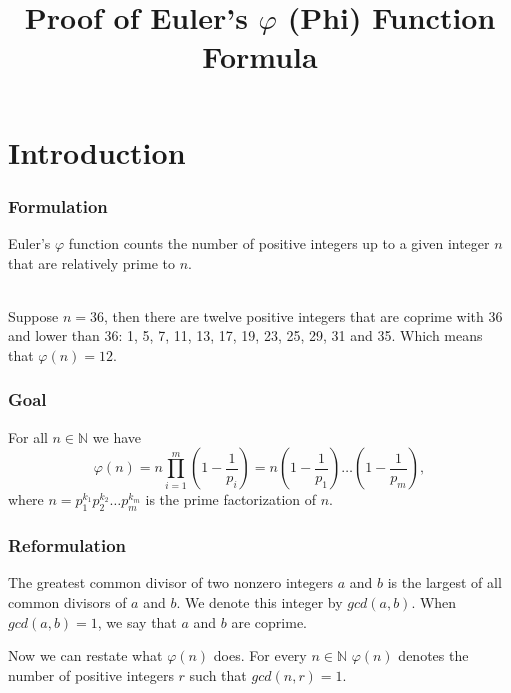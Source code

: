 \documentclass[envcountsect]{beamer}
\author[Emils Kalugins]{Presented by Emils Kalugins \\~\\
{\small Paper\footnotemark{} authored by:\\ Shashank Chorge\footnotemark{} \and Juan Vargas\footnotemark{}}}
\title{Proof of Euler's $\varphi$ (Phi) Function Formula}
\institute{Univesity of Latvia}
\begin{document}
\begin{frame}
\maketitle


\end{frame}

\section{Introduction}

\begin{frame}
\frametitle{Formulation}

Euler's $\varphi$ function counts the number of positive integers up to a given
integer $n$ that are relatively prime to $n$. \\~\\ 


\begin{example}
Suppose $n = 36$, then there are twelve positive integers that are coprime with 36
and lower than 36: 1, 5, 7, 11, 13, 17, 19, 23, 25, 29, 31 and 35. Which means
that $\varphi(n) = 12$. 
\end{example}

\end{frame}

\begin{frame}
\frametitle{Goal}

\begin{theorem}
For all $n \in \mathbb{N}$ we have $$ \varphi(n) = n\prod_{i=1}^m
\left(1-\frac{1}{p_i}\right) = n\left(1-\frac{1}{p_1}\right) \dots
\left(1-\frac{1}{p_m} \right), $$ 
where $n = p_1^{k_1}p_2^{k_2}\dots p_m^{k_m} $ is the prime
factorization of $n$.
\end{theorem}

\end{frame}

\begin{frame}
\frametitle{Reformulation}

\begin{definition}
The greatest common divisor of two nonzero integers $a$ and $b$ is the largest of
all common divisors of $a$ and $b$. We denote this integer by $gcd(a,b)$. When
$gcd(a,b) = 1$, we say that $a$ and $b$ are coprime.
\end{definition}

\vfill

Now we can restate what $\varphi(n)$ does. For every $n \in \mathbb{N}$
$\varphi(n)$ denotes the number of positive integers $r$ such that $gcd(n,r) = 1$.

\vfill
\end{frame}
\end{document}
